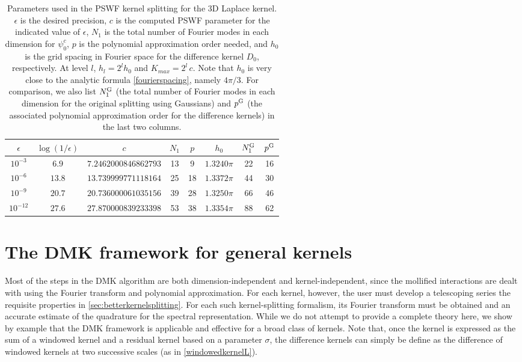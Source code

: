 \documentclass[final,letterpaper]{siamart171218}
\newcommand{\psic}{{\psi_0^c}}
\newcommand{\acron}{DMK }
\begin{document}
\begin{table}[t]
  \caption{\sf Parameters used in the PSWF kernel splitting for the 3D Laplace
    kernel. $\epsilon$ is the desired precision, $c$ is the computed PSWF parameter
    for the indicated value of $\epsilon$, $N_1$ is the total number of Fourier modes
    in each dimension for $\psic$, $p$ is the polynomial approximation order needed,
    and $h_0$ is the grid spacing in Fourier space for the difference
    kernel $D_0$, respectively.
    At level $l$, $h_l = 2^l h_0$ and $K_{max} = 2^l \, c$.
    Note that $h_0$ is very close to the analytic formula \cref{fourierspacing}, 
    namely $4 \pi/3$. For comparison, we also list $N_1^{\rm G}$ (the total number
    of Fourier modes in each dimension for the original splitting using Gaussians) and 
    $p^{\rm G}$ (the associated polynomial approximation order for the difference kernels)
    in the last two columns.}
\centering
\begin{tabular}{c|c|c|c|c|c|c|c}
\toprule
$\epsilon$ & $\log(1/\epsilon)$ & $c$ & $N_1$ & $p$ & $h_0$ & $N_1^{\rm G}$ & $p^{\rm G}$\\
\midrule
$10^{-3}$  & $6.9$  & $7.2462000846862793$ & 13 & 9  & $1.3240\pi$ & 22 & 16 \\
$10^{-6}$  & $13.8$ & $13.739999771118164$ & 25 & 18 & $1.3372\pi$ & 44 & 30 \\
$10^{-9}$  & $20.7$ & $20.736000061035156$ & 39 & 28 & $1.3250\pi$ & 66 & 46 \\
$10^{-12}$ & $27.6$ & $27.870000839233398$ & 53 & 38 & $1.3354\pi$ & 88 & 62 \\
\bottomrule
\end{tabular}
\label{tablepswfparameters}
\end{table}

\section{The \acron framework for general kernels}

Most of the steps in the \acron algorithm are both dimension-independent and kernel-independent,
since the mollified interactions are dealt with using the 
Fourier transform and polynomial approximation. 
For each kernel, however, the user must develop a telescoping series the requisite 
properties in \cref{sec:betterkernelsplitting}.
For each such kernel-splitting formalism, its Fourier transform must be obtained and
an accurate estimate of the quadrature for the spectral representation.
While we do not attempt to provide a complete theory here, we show by example that
the \acron framework is applicable and effective for a broad class of kernels. 
Note that, once the kernel is expressed as the
sum of a windowed kernel and a residual kernel based on a parameter $\sigma$,
the difference kernels can simply be define as the
difference of windowed kernels at two successive scales (as in \cref{windowedkernelL}).
\end{document}
